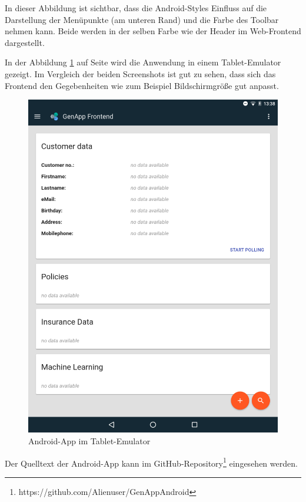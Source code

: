 In dieser Abbildung ist sichtbar, dass die Android-Styles Einfluss auf die Darstellung der Menüpunkte (am unteren Rand)
und die Farbe des Toolbar nehmen kann. Beide werden in der selben Farbe wie der Header im Web-Frontend dargestellt.

In der Abbildung \ref{fig:frontend_tablet_android} auf Seite \pageref{fig:frontend_tablet_android} wird die Anwendung in
einem Tablet-Emulator gezeigt. Im Vergleich der beiden Screenshots ist gut zu sehen, dass sich das Frontend den Gegebenheiten
wie zum Beispiel Bildschirmgröße gut anpasst.

\begin{figure}[h]
 \centering
   \includegraphics[scale=0.18]{images/kapitel_4/frontend_tablet_android.png}
 \caption{Android-App im Tablet-Emulator}
 \label{fig:frontend_tablet_android}
\end{figure}

Der Quelltext der Android-App kann im GitHub-Repository\footnote{https://github.com/Alienuser/GenAppAndroid} eingesehen
werden.

